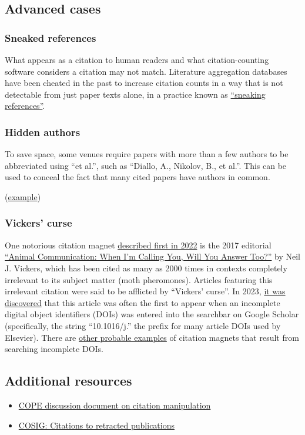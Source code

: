 \documentclass[letterpaper, 12pt]{article}
\begin{document}
\subsection*{Advanced cases}

\subsubsection*{Sneaked references}

What appears as a citation to human readers and what citation-counting software considers a citation may not match.
Literature aggregation databases have been cheated in the past to increase citation counts in a way that is not detectable from just paper texts alone, in a practice known as \href{https://doi.org/10.1002/asi.24896}{``sneaking references''}.

\subsubsection*{Hidden authors}

To save space, some venues require papers with more than a few authors to be abbreviated using ``et al.'',
such as ``Diallo, A., Nikolov, B., et al.''.
This can be used to conceal the fact that many cited papers have authors in common.

(\href{https://pubpeer.com/publications/00DCF18F504B8C420F12A70B5FB30C}{example})

\subsubsection*{Vickers' curse}

One notorious citation magnet \href{https://forbetterscience.com/2022/10/31/when-im-citing-you-will-you-answer-too/}{described first in 2022} is the 2017 editorial \href{https://doi.org/10.1016/j.cub.2017.05.064}{``Animal Communication: When I’m Calling You, Will You Answer Too?''} by Neil J. Vickers, which has been cited as many as 2000 times in contexts completely irrelevant to its subject matter (moth pheromones). Articles featuring this irrelevant citation were said to be afflicted by ``Vickers' curse''. In 2023, \href{https://forbetterscience.com/2023/07/31/the-vickers-curse-secret-revealed/}{it was discovered} that this article was often the first to appear when an incomplete digital object identifiers (DOIs) was entered into the searchbar on Google Scholar (specifically, the string ``10.1016/j.'' the prefix for many article DOIs used by Elsevier). There are \href{https://pubpeer.com/publications/4BB5BE5F56EFEBC3A67D89D1EB5501}{other probable examples} of citation magnets that result from searching incomplete DOIs. 

\subsection*{Additional resources}

\begin{itemize}
    \setlength\itemsep{-0.5em}
    \item \href{https://doi.org/10.24318/cope.2019.3.1}{COPE discussion document on citation manipulation}
    \item \href{https://osf.io/9q3as}{COSIG: Citations to retracted publications}
\end{itemize}
\end{document}
